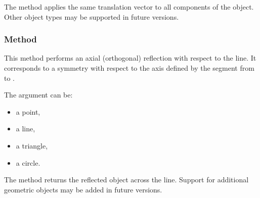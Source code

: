 \noindent
The method applies the same translation vector to all components of the object. Other object types may be supported in future versions.

\vspace{1em}

\begin{tkzexample}[latex=.5\textwidth]
\begin{center}
\end{center}
\end{tkzexample}

\subsubsection{Method }
\label{ssub:reflection_of_object}

This method performs an axial (orthogonal) reflection with respect to the line. It corresponds to a symmetry with respect to the axis defined by the segment from  to .

\medskip
\noindent
The argument  can be:
\begin{itemize}
  \item a point,
  \item a line,
  \item a triangle,
  \item a circle.
\end{itemize}

\noindent
The method returns the reflected object across the line. Support for additional geometric objects may be added in future versions.

\vspace{1em}

\begin{tkzexample}[latex=.5\textwidth]

\begin{center}
\end{center}
\end{tkzexample}

